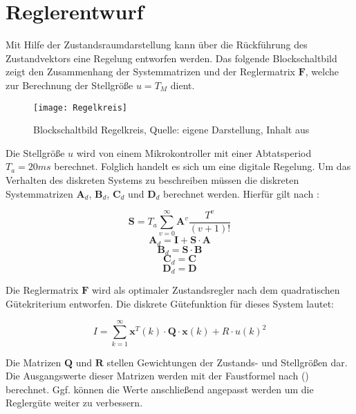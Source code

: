 \section{Reglerentwurf}
Mit Hilfe der Zustandsraumdarstellung kann über die Rückführung des Zustandvektors eine Regelung entworfen werden. Das folgende Blockschaltbild zeigt den Zusammenhang der Systemmatrizen und der Reglermatrix $\textbf{F}$, welche zur Berechnung der Stellgröße $u=T_M$ dient.

\begin{figure}[h]
\label{Regelkreis_pic}
\texttt{[image: Regelkreis]}
\caption{Blockschaltbild Regelkreis, Quelle: eigene Darstellung, Inhalt aus \cite{RT2}}
\end{figure}

Die Stellgröße $u$ wird von einem Mikrokontroller mit einer Abtatsperiod $T_a = 20ms$ berechnet. Folglich handelt es sich um eine digitale Regelung. Um das Verhalten des diskreten Systems zu beschreiben müssen die diskreten Systemmatrizen $\textbf{A}_d$, $\textbf{B}_d$, $\textbf{C}_d$ und $\textbf{D}_d$ berechnet werden. Hierfür gilt nach \cite{RT2}:

\begin{equation}
\textbf{S} = T_a \sum_{v=0}^{\infty} \textbf{A}^v \frac{T^v}{(v+1)!}
\end{equation}
\begin{equation}
\textbf{A}_d = \textbf{I} + \textbf{S} \cdot \textbf{A}
\end{equation}
\begin{equation}
\textbf{B}_d = \textbf{S} \cdot \textbf{B}
\end{equation}
\begin{equation}
\textbf{C}_d = \textbf{C}
\end{equation}
\begin{equation}
\textbf{D}_d = \textbf{D}
\end{equation}

Die Reglermatrix $\textbf{F}$ wird als optimaler Zustandsregler nach dem quadratischen Gütekriterium entworfen. Die diskrete Gütefunktion für dieses System lautet:

\begin{equation}
\label{costfunction_equation}
I = \sum_{k=1}^\infty \textbf{x}^T(k) \cdot \textbf{Q} \cdot \textbf{x}(k) + R\cdot u(k)^2
\end{equation}

Die Matrizen $\textbf{Q}$ und $\textbf{R}$ stellen Gewichtungen der Zustands- und Stellgrößen dar. Die Ausgangswerte dieser Matrizen werden mit der Faustformel nach (\cite{lqrnotes}) berechnet. Ggf. können die Werte anschließend angepasst werden um die Reglergüte weiter zu verbessern.

